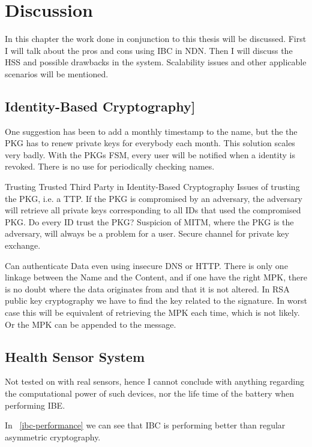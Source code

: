 \chapter{Discussion}
In this chapter the work done in conjunction to this thesis will be discussed. 
First I will talk about the pros and cons using \gls{IBC} in \gls{NDN}.
Then I will discuss the \gls{HSS} and possible drawbacks in the system. 
Scalability issues and other applicable scenarios will be mentioned.

\section{Identity-Based Cryptography]}
One suggestion has been to add a monthly timestamp to the name, but the the \gls{PKG} has to renew private keys for everybody each month. 
This solution scales very badly.
With the \gls{PKG}s \gls{FSM}, every user will be notified when a identity is revoked.
There is no use for periodically checking names.

Trusting Trusted Third Party in Identity-Based Cryptography
Issues of trusting the \gls{PKG}, i.e. a \gls{TTP}. 
If the \gls{PKG} is compromised by an adversary, the adversary will retrieve all private keys corresponding to all IDs that used the compromised \gls{PKG}. 
Do every ID trust the \gls{PKG}? Suspicion of \gls{MITM}, where the \gls{PKG} is the adversary, will always be a problem for a user.
Secure channel for private key exchange. 

Can authenticate Data even using insecure DNS or HTTP. 
There is only one linkage between the Name and the Content, and if one have the right \gls{MPK}, there is no doubt where the data originates from and that it is not altered.
In RSA public key cryptography we have to find the key related to the signature. 
In worst case this will be equivalent of retrieving the \gls{MPK} each time, which is not likely. 
Or the \gls{MPK} can be appended to the message.

\section{Health Sensor System}
Not tested on with real sensors, hence I cannot conclude with anything regarding the computational power of such devices, nor the life time of the battery when performing \gls{IBE}.  

In ~\autoref{ibc-performance} we can see that \gls{IBC} is performing better than regular asymmetric cryptography. 

